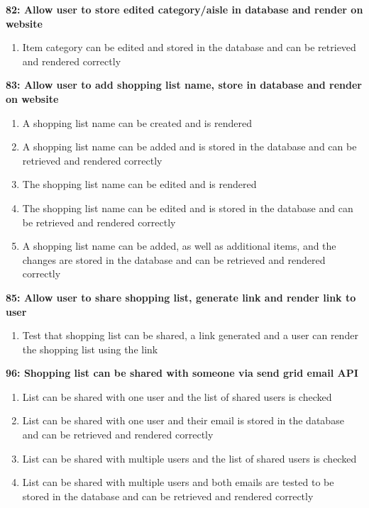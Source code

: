 \documentclass[10pt,onecolumn]{witseiepaper}
\begin{document}
\textbf{82: Allow user to store edited category/aisle in database and render on website}

\begin{enumerate}
	\item Item category can be edited and stored in the database and can be retrieved and rendered correctly
\end{enumerate}

\textbf{83: Allow user to add shopping list name, store in database and render on website}

\begin{enumerate}
	\item A shopping list name can be created and is rendered
	\item A shopping list name can be added and is stored in the database and can be retrieved and rendered correctly
	\item The shopping list name can be edited and is rendered
	\item The shopping list name can be edited and is stored in the database and can be retrieved and rendered correctly
	\item  A shopping list name can be added, as well as additional items, and the changes are stored in the database and can be retrieved and rendered correctly
\end{enumerate}

\textbf{85: Allow user to share shopping list, generate link and render link to user}

\begin{enumerate}
	\item Test that shopping list can be shared, a link generated and a user can render the shopping list using the link
\end{enumerate}


\textbf{96: Shopping list can be shared with someone via send grid email API}
\begin{enumerate}
	\item List can be shared with one user and the list of shared users is checked
	\item List can be shared with one user and their email is stored in the database and can be retrieved and rendered correctly
	\item List can be shared with multiple users and the list of shared users is checked
	\item List can be shared with multiple users and both emails are tested to be stored in the database and can be retrieved and rendered correctly
\end{enumerate}
\end{document}
